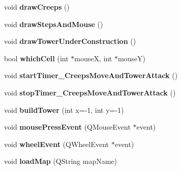 \begin{DoxyCompactItemize}
\item 
\hypertarget{class_game_widget_a33a8d01490aec991b404af2f27610451}{}void {\bfseries draw\+Creeps} ()\label{class_game_widget_a33a8d01490aec991b404af2f27610451}

\item 
\hypertarget{class_game_widget_a5d210ec305162411577b6c362d3bd448}{}void {\bfseries draw\+Steps\+And\+Mouse} ()\label{class_game_widget_a5d210ec305162411577b6c362d3bd448}

\item 
\hypertarget{class_game_widget_a6e425a0c47a4fbf05009388ea93579d1}{}void {\bfseries draw\+Tower\+Under\+Construction} ()\label{class_game_widget_a6e425a0c47a4fbf05009388ea93579d1}

\item 
\hypertarget{class_game_widget_a9df65927334cdc693870e2926511dfba}{}bool {\bfseries which\+Cell} (int $\ast$mouse\+X, int $\ast$mouse\+Y)\label{class_game_widget_a9df65927334cdc693870e2926511dfba}

\item 
\hypertarget{class_game_widget_a45b4ae7cf382f57157c9c5b24cfa8f9a}{}void {\bfseries start\+Timer\+\_\+\+Creeps\+Move\+And\+Tower\+Attack} ()\label{class_game_widget_a45b4ae7cf382f57157c9c5b24cfa8f9a}

\item 
\hypertarget{class_game_widget_a71dc2085cdb968e58081de7c7e21b8c8}{}void {\bfseries stop\+Timer\+\_\+\+Creeps\+Move\+And\+Tower\+Attack} ()\label{class_game_widget_a71dc2085cdb968e58081de7c7e21b8c8}

\item 
\hypertarget{class_game_widget_a0cbc78b076a979a0969534ba31804990}{}void {\bfseries build\+Tower} (int x=-\/1, int y=-\/1)\label{class_game_widget_a0cbc78b076a979a0969534ba31804990}

\item 
\hypertarget{class_game_widget_a72d2d653c67497ac53710afcaafdc3a3}{}void {\bfseries mouse\+Press\+Event} (Q\+Mouse\+Event $\ast$event)\label{class_game_widget_a72d2d653c67497ac53710afcaafdc3a3}

\item 
\hypertarget{class_game_widget_a2828eb6c2f13aa59d00b08499caf1eaf}{}void {\bfseries wheel\+Event} (Q\+Wheel\+Event $\ast$event)\label{class_game_widget_a2828eb6c2f13aa59d00b08499caf1eaf}

\item 
\hypertarget{class_game_widget_ab0c9b30f5ea6717a7841adae9000eafc}{}void {\bfseries load\+Map} (Q\+String map\+Name)\label{class_game_widget_ab0c9b30f5ea6717a7841adae9000eafc}

\end{DoxyCompactItemize}
